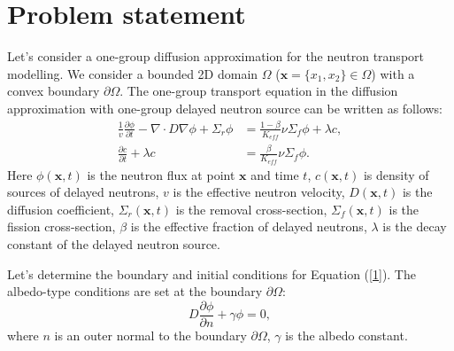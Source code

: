 \documentclass[10pt]{article}
\begin{document}
\section{Problem statement}
Let's consider a one-group diffusion approximation for the neutron transport modelling. 
We consider a bounded 2D domain  $\Omega$ ($\bm x = \{x_1, x_2\} \in \Omega$) with a convex boundary $\partial \Omega$. 
The one-group transport equation in the diffusion approximation with one-group delayed neutron source can be written as follows:
\begin{equation}\label{1}
\begin{split}
 \frac{1}{v} \frac{\partial \phi}{\partial t} - \nabla \cdot D \nabla \phi + \Sigma_r \phi &= \frac{1 - \beta}{K_{eff}} \nu \Sigma_f \phi + \lambda c, \\
\frac{\partial c}{\partial t} + \lambda c &= \frac{\beta}{K_{eff}} \nu \Sigma_f \phi.
\end{split}
\end{equation} 
Here $\phi(\bm x,t)$ is the neutron flux  at point $\bm x$ and time $t$,
$c(\bm x,t)$ is density of sources of delayed neutrons,
$v$ is the effective neutron velocity,
$D(\bm x, t)$ is the diffusion coefficient, 
$\Sigma_r(\bm x,t)$ is the removal cross-section,
$\Sigma_f(\bm x,t)$ is the fission cross-section,
$\beta$ is the effective fraction of delayed neutrons, 
$\lambda$ is the decay constant of the delayed neutron source.

Let's determine the boundary and initial conditions for Equation (\ref{1}).
The albedo-type conditions are set at the boundary  $\partial \Omega$:
\begin{equation}\label{2}
 D\frac{\partial \phi}{\partial n} + \gamma \phi = 0,
\end{equation} 
where $n$ is an outer normal to the boundary $\partial \Omega$, $\gamma$ is the albedo constant.
\end{document}
